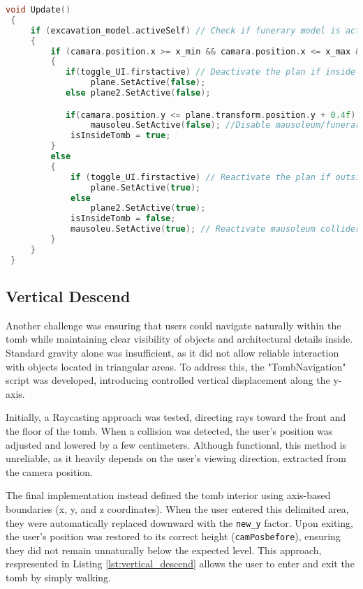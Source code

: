 \begin{lstlisting}[language=C++, caption={Plan Removal approach in Update method().}, label={lst:plan_removal},float]
 void Update()
 {
     if (excavation_model.activeSelf) // Check if funerary model is active
     {
         if (camara.position.x >= x_min && camara.position.x <= x_max && camara.position.z <= z_max && camara.position.z >= z_min && camara.position.y <= y_max && camara.position.y >= y_min)
         {
            if(toggle_UI.firstactive) // Deactivate the plan if inside the tomb area
                 plane.SetActive(false);
            else plane2.SetActive(false);

            if(camara.position.y <= plane.transform.position.y + 0.4f) 
                 mausoleu.SetActive(false); //Disable mausoleum/funerary collider so the user can fall inside the tomb without colliding
             isInsideTomb = true;
         }
         else
         {
             if (toggle_UI.firstactive) // Reactivate the plan if outside the tomb area
                 plane.SetActive(true);
             else
                 plane2.SetActive(true);
             isInsideTomb = false;
             mausoleu.SetActive(true); // Reactivate mausoleum collider 
         }
     }
 }
\end{lstlisting}
\subsection*{Vertical Descend}

Another challenge was ensuring that users could navigate naturally within the tomb while maintaining clear visibility of objects and architectural details inside. Standard gravity alone was insufficient, as it did not allow reliable interaction with objects located in triangular areas.
To address this, the "TombNavigation" script was developed, introducing controlled vertical displacement along the y-axis.

Initially, a Raycasting approach was tested, directing rays toward the front and the floor of the tomb. When a collision was detected, the user’s position was adjusted and lowered by a few centimeters. Although functional, this method is unreliable, as it heavily depends on the user’s viewing direction, extracted from the camera position.

The final implementation instead defined the tomb interior using axis-based boundaries (x, y, and z coordinates). 
When the user entered this delimited area, they were automatically replaced downward with the \texttt{new\_y} factor. Upon exiting, the user’s position was restored to its correct height (\texttt{camPosbefore}), ensuring they did not remain unnaturally below the expected level. 
This approach, respresented in Listing \ref{lst:vertical_descend} allows the user to enter and exit the tomb by simply walking.

